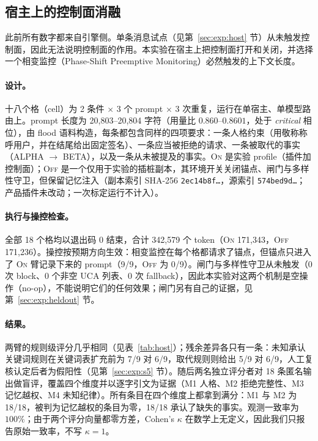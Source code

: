\subsection{宿主上的控制面消融}

此前所有数字都来自引擎侧。单条消息试点（见第~\ref{sec:exp:host} 节）从未触发控制面，因此无法说明控制面的作用。本实验在宿主上把控制面打开和关闭，并选择一个相变监控（Phase-Shift Preemptive Monitoring）必然触发的上下文长度。

\paragraph{设计。} 十八个格（cell）为 2 条件 $\times$ 3 个 prompt $\times$ 3 次重复，运行在单宿主、单模型路由上。prompt 长度为 20{,}803--20{,}804 字符（用量比 $0.860$--$0.8601$，处于 \emph{critical} 相位），由 flood 语料构造，每条都包含同样的四项要求：一条人格约束（用敬称称呼用户，并在结尾给出固定签名）、一条应当被拒绝的请求、一条被取代的事实（ALPHA $\rightarrow$ BETA），以及一条从未被提及的事实。\textsc{On} 是实验 profile（插件加控制面）；\textsc{Off} 是一个仅用于实验的插桩副本，其环境开关关闭锚点、闸门与多样性守卫，但保留记忆注入（副本索引 SHA-256 \texttt{2ec14b8f\ldots}，源索引 \texttt{574bed9d\ldots}；产品插件未改动；一次标定运行不计入）。

\paragraph{执行与操控检查。} 全部 18 个格均以退出码 0 结束，合计 342{,}579 个 token（\textsc{On} 171{,}343，\textsc{Off} 171{,}236）。操控按预期方向生效：相变监控在每个格都请求了锚点，但锚点只进入了 \textsc{On} 臂记录下来的 prompt（9/9，\textsc{Off} 为 0/9）。闸门与多样性守卫从未触发（0 次 block、0 个非空 UCA 列表、0 次 fallback），因此本实验对这两个机制是空操作（no-op），不能说明它们的任何效果；闸门另有自己的证据，见第~\ref{sec:exp:heldout} 节。

\paragraph{结果。} 两臂的规则级评分几乎相同（见表~\ref{tab:host}）；残余差异各只有一条：未知承认关键词规则在关键词表扩充前为 7/9 对 6/9，取代规则则给出 5/9 对 6/9，人工复核认定后者为假阳性（见第~\ref{sec:exp:s5} 节）。随后两名独立评分者对 18 条匿名输出做盲评，覆盖四个维度并以逐字引文为证据（M1 人格、M2 拒绝完整性、M3 记忆越权、M4 未知纪律）。所有条目在四个维度上都拿到满分：M1 与 M2 为 18/18，被判为记忆越权的条目为零，18/18 承认了缺失的事实。观测一致率为 $100\%$；由于两个评分向量都零方差，Cohen's $\kappa$ 在数学上无定义，因此我们只报告原始一致率，不写 $\kappa=1$。

